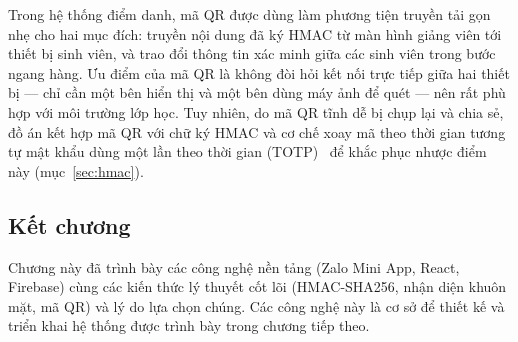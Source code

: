 \documentclass[../main.tex]{subfiles}
\begin{document}
Trong hệ thống điểm danh, mã QR được dùng làm phương tiện truyền tải gọn nhẹ cho hai mục đích:
truyền nội dung đã ký HMAC từ màn hình giảng viên tới thiết bị sinh viên, và trao đổi thông
tin xác minh giữa các sinh viên trong bước ngang hàng. Ưu điểm của mã QR là không đòi hỏi kết
nối trực tiếp giữa hai thiết bị --- chỉ cần một bên hiển thị và một bên dùng máy ảnh để quét
--- nên rất phù hợp với môi trường lớp học. Tuy nhiên, do mã QR tĩnh dễ bị chụp lại và chia
sẻ, đồ án kết hợp mã QR với chữ ký HMAC và cơ chế xoay mã theo thời gian tương tự mật khẩu dùng
một lần theo thời gian (TOTP)~\cite{rfc6238} để khắc phục nhược điểm này (mục~\ref{sec:hmac}).

\subsection*{Kết chương}
Chương này đã trình bày các công nghệ nền tảng (Zalo Mini App, React, Firebase) cùng các
kiến thức lý thuyết cốt lõi (HMAC-SHA256, nhận diện khuôn mặt, mã QR) và lý do lựa
chọn chúng. Các công nghệ này là cơ sở để thiết kế và triển khai hệ thống được trình bày
trong chương tiếp theo.
\end{document}
